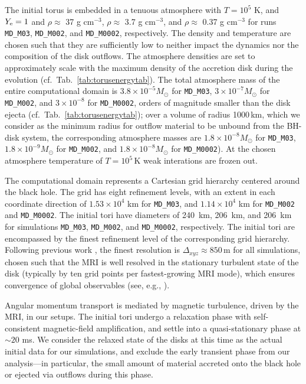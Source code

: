 The initial torus is embedded in a tenuous atmosphere with $T = 10^5$ K, and $Y_{\rm e} = 1$ and $\rho \approx$ 37 g cm$^{-3}$, $\rho \approx$ 3.7 g cm$^{-3}$, and $\rho \approx$ 0.37 g cm$^{-3}$ for runs \texttt{MD\_M03}, \texttt{MD\_M002}, and \texttt{MD\_M0002}, respectively. The density and temperature are chosen such that they are sufficiently low to neither impact the dynamics nor the composition of the disk outflows. The atmosphere densities are set to approximately scale with the maximum density of the accretion disk during the evolution (cf.~Tab.~\ref{tab:torusenergytab}). The total atmosphere mass of the entire computational domain is $3.8\times 10^{-5} M_\odot$ for \texttt{MD\_M03}, $3\times 10^{-7} M_\odot$ for \texttt{MD\_M002}, and $3\times 10^{-8}$ for \texttt{MD\_M0002}, orders of magnitude smaller than the disk ejecta (cf.~Tab.~\ref{tab:torusenergytab}); over a volume of radius 1000\,km, which we consider as the minimum radius for outflow material to be unbound from the BH-disk system, the corresponding atmosphere masses are $1.8\times 10^{-8} M_\odot$ for \texttt{MD\_M03}, $1.8\times 10^{-9} M_\odot$ for \texttt{MD\_M002}, and $1.8\times 10^{-8} M_\odot$ for \texttt{MD\_M0002}). At the chosen atmosphere temperature of $T = 10^5$\,K weak interations are frozen out.

The computational domain represents a Cartesian grid hierarchy centered around the black hole. The grid has eight refinement levels, with an extent in each coordinate direction of $1.53\times 10^4$ km for \texttt{MD\_M03}, and $1.14\times 10^4$ km for \texttt{MD\_M002} and \texttt{MD\_M0002}. The initial tori have diameters of 240~km, 206~km, and 206~km for simulations \texttt{MD\_M03}, \texttt{MD\_M002}, and \texttt{MD\_M0002}, respectively. The initial tori are encompassed by the finest refinement level of the corresponding grid hierarchy. Following previous work \cite{siegel_magnetorotational_2013,Siegel:2017jug,siegel_collapsars_2019}, the finest resolution is $\Delta_{xyz} \approx 850$\,m for all simulations, chosen such that the MRI is well resolved in the stationary turbulent state of the disk (typically by ten grid points per fastest-growing MRI mode), which ensures convergence of global observables (see, e.g., \cite{siegel_collapsars_2019}).

Angular momentum transport is mediated by magnetic turbulence, driven by the MRI, in our setups. The initial tori undergo a relaxation phase with self-consistent magnetic-field amplification, and settle into a quasi-stationary phase at $\sim\!20$ ms. We consider the relaxed state of the disks at this time as the actual initial data for our simulations, and exclude the early transient phase from our analysis---in particular, the small amount of material accreted onto the black hole or ejected via outflows during this phase.

